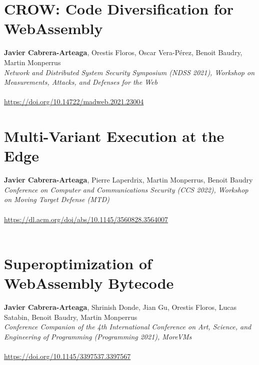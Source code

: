 %
    {} %
    {} %


\chapter{CROW: Code Diversification for WebAssembly}

\textbf{Javier Cabrera-Arteaga}, Orestis Floros, Oscar Vera-Pérez, Benoit Baudry, Martin Monperrus\\
\emph{Network and Distributed System Security Symposium (NDSS 2021), Workshop on Measurements, Attacks, and Defenses for the Web}\\\\
\url{https://doi.org/10.14722/madweb.2021.23004}\\

%
    {} %
    {} %
    
\chapter{Multi-Variant Execution at the Edge}

\textbf{Javier Cabrera-Arteaga}, Pierre Laperdrix, Martin Monperrus, Benoit Baudry\\
\emph{Conference on Computer and Communications Security (CCS 2022), Workshop on Moving Target Defense (MTD)}\\\\
 \url{https://dl.acm.org/doi/abs/10.1145/3560828.3564007}\\\\

%
    {} %
    {} %
    
  \chapter{Superoptimization of WebAssembly Bytecode}

  \textbf{Javier Cabrera-Arteaga}, Shrinish Donde, Jian Gu, Orestis Floros, Lucas Satabin, Benoit Baudry, Martin Monperrus\\
  \emph{Conference Companion of the 4th International Conference on Art, Science, and Engineering of Programming (Programming 2021), MoreVMs}\\\\
  \url{https://doi.org/10.1145/3397537.3397567}\\
  
